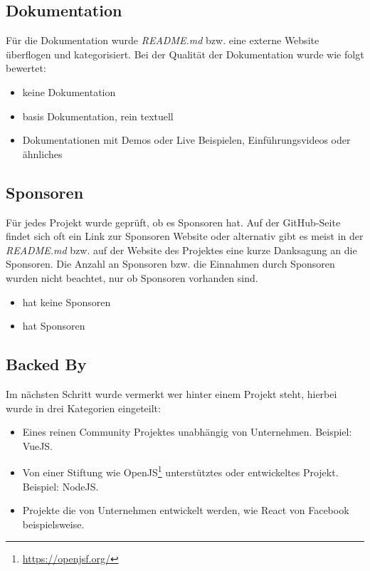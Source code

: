 \subsection{Dokumentation}
Für die Dokumentation wurde \textit{README.md} bzw. eine externe Website überflogen und kategorisiert.
Bei der Qualität der Dokumentation wurde wie folgt bewertet:

\begin{itemize}[noitemsep]
    \item[0 =] keine Dokumentation
    \item[1 =] basis Dokumentation, rein textuell
    \item[2 =] Dokumentationen mit Demos oder Live Beispielen,
        Einführungsvideos oder ähnliches
\end{itemize}


\subsection{Sponsoren}
Für jedes Projekt wurde geprüft, ob es Sponsoren hat. Auf der GitHub-Seite findet sich oft ein Link
zur Sponsoren Website oder alternativ gibt es meist in der \textit{README.md} bzw. auf der Website
des Projektes eine kurze Danksagung an die Sponsoren. Die Anzahl an Sponsoren bzw. die Einnahmen
durch Sponsoren wurden nicht beachtet, nur ob Sponsoren vorhanden sind.

\begin{itemize}[noitemsep]
    \item[0 =] hat keine Sponsoren
    \item[1 =] hat Sponsoren
\end{itemize}


\newpage %
\subsection{Backed By}
Im nächsten Schritt wurde vermerkt wer hinter einem Projekt steht, hierbei wurde in drei Kategorien
eingeteilt:

\begin{itemize}[noitemsep]
    \item[0 =] Eines reinen Community Projektes unabhängig von Unternehmen. Beispiel: VueJS.
    \item[1 =] Von einer Stiftung wie OpenJS\footnote{\url{https://openjsf.org/}} unterstütztes oder
        entwickeltes Projekt.\\ Beispiel: NodeJS.
    \item[2 =] Projekte die von Unternehmen entwickelt werden, wie React von Facebook beispielsweise.
\end{itemize}

